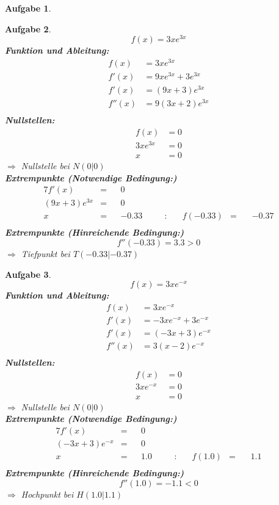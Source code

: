 \documentclass[12pt]{article}
\theoremstyle{note}
\newtheorem{aufgabe}{Aufgabe}
\begin{document}
\begin{flushleft}
\begin{aufgabe}
\end{aufgabe}\clearpage\begin{aufgabe} ~  
$$f(x)=3 x e^{3 x}$$ 
{\bf Funktion und Ableitung:} 
\begin{align*} 
f(x)&=3 x e^{3 x}\\ 
f'(x)&=9 x e^{3 x} + 3 e^{3 x}\\ 
f'(x)&=\left(9 x + 3\right) e^{3 x}\\ 
f''(x)&=9 \left(3 x + 2\right) e^{3 x}\\ 
\end{align*} 
{\bf Nullstellen:} 
\begin{align*} 
f(x)&=0 \\ 
3 x e^{3 x}&=0 \\ 
x&=0\end{align*} 
$\Rightarrow$ Nullstelle bei $N(0|0)$ \\ 
{\bf Extrempunkte (Notwendige Bedingung:)} 
\begin{alignat*}{7} 
f'(x)&=& &0& \\ 
\left(9 x + 3\right) e^{3 x}&=& &0& \\ 
x&=& &-0.33& \quad &:& \quad f(-0.33)&=& \, &-0.37\\ 
\end{alignat*} 
{\bf Extrempunkte (Hinreichende Bedingung:)} 
\\ 
$$f''(-0.33)=3.3> 0 $$ 
$\Rightarrow$ Tiefpunkt bei $T(-0.33|-0.37)$ \\ 

\end{aufgabe}\clearpage\begin{aufgabe} ~  
$$f(x)=3 x e^{- x}$$ 
{\bf Funktion und Ableitung:} 
\begin{align*} 
f(x)&=3 x e^{- x}\\ 
f'(x)&=- 3 x e^{- x} + 3 e^{- x}\\ 
f'(x)&=\left(- 3 x + 3\right) e^{- x}\\ 
f''(x)&=3 \left(x - 2\right) e^{- x}\\ 
\end{align*} 
{\bf Nullstellen:} 
\begin{align*} 
f(x)&=0 \\ 
3 x e^{- x}&=0 \\ 
x&=0\end{align*} 
$\Rightarrow$ Nullstelle bei $N(0|0)$ \\ 
{\bf Extrempunkte (Notwendige Bedingung:)} 
\begin{alignat*}{7} 
f'(x)&=& &0& \\ 
\left(- 3 x + 3\right) e^{- x}&=& &0& \\ 
x&=& &1.0& \quad &:& \quad f(1.0)&=& \, &1.1\\ 
\end{alignat*} 
{\bf Extrempunkte (Hinreichende Bedingung:)} 
\\ 
$$f''(1.0)=-1.1< 0 $$ 
$\Rightarrow$ Hochpunkt bei $H(1.0|1.1)$ \\ 

\end{aufgabe}\clearpage
\end{flushleft} 
\end{document}
